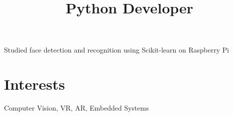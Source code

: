 \documentclass[margin]{res}
\begin{document}
\begin{resume}
      \title{\textbf{Python Developer}}
      \begin{position}
        Studied face detection and recognition using Scikit-learn on Raspberry Pi
      \end{position}

    \section{Interests}
      Computer Vision, VR, AR, Embedded Systems
  \end{resume}
\end{document}
